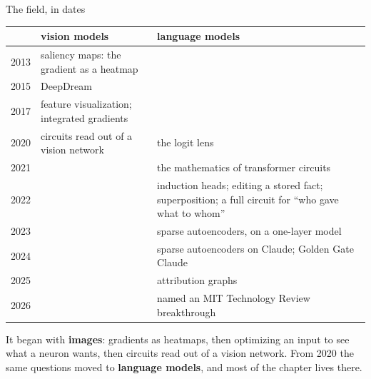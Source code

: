 \documentclass[aspectratio=169]{beamer}
\begin{document}
\begin{frame}{The field, in dates}
  \vspace{-0.2em}
  \begin{center}
  \footnotesize
  \begin{tabular}{@{}l>{\raggedright\arraybackslash\leavevmode\color{armblue}}p{}>{\raggedright\arraybackslash\leavevmode\color{armred}}p{}@{}}
    \toprule
    & \textbf{vision models} & \textbf{language models}\\
    \midrule
    2013 & saliency maps: the gradient as a heatmap & \\
    2015 & DeepDream & \\
    2017 & feature visualization; integrated gradients & \\
    2020 & circuits read out of a vision network & the logit lens\\
    2021 & & the mathematics of transformer circuits\\
    2022 & & induction heads; editing a stored fact; superposition; a full circuit for ``who gave
      what to whom''\\
    2023 & & sparse autoencoders, on a one-layer model\\
    2024 & & sparse autoencoders on Claude; Golden Gate Claude\\
    2025 & & attribution graphs\\
    2026 & & named an MIT Technology Review breakthrough\\
    \bottomrule
  \end{tabular}
  \end{center}

  \vspace{0.3em}
  {\small It began with \textbf{images}: gradients as heatmaps, then optimizing an input to see what a
  neuron wants, then circuits read out of a vision network. From 2020 the same questions moved to
  \textbf{language models}, and most of the chapter lives there.}
\end{frame}
\end{document}

